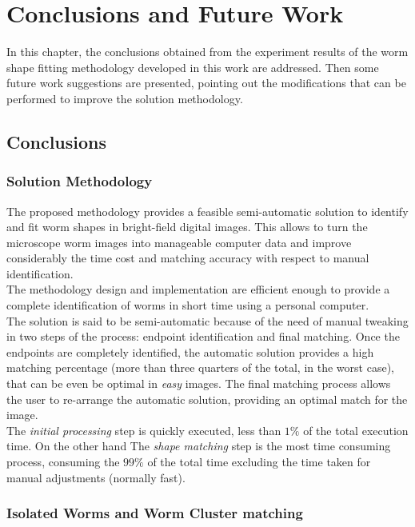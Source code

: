 \thispagestyle{empty}
\cleardoublepage
\chapter{Conclusions and Future Work}

In this chapter, the conclusions obtained from the experiment results of the 
worm shape fitting methodology developed in this work are addressed.
Then some future work suggestions are presented, pointing out the modifications
that can be performed to improve the solution methodology.

\section{Conclusions}

\subsection*{Solution Methodology}

The proposed methodology provides a feasible semi-automatic solution
to identify and fit worm shapes in bright-field digital images. This allows
to turn the microscope worm images into manageable computer data and 
improve considerably the time cost and matching accuracy with respect
to manual identification.\\
The methodology design and implementation are efficient enough to provide
a complete identification of worms in short time using a personal computer.\\
The solution is said to be semi-automatic because of the need of manual
tweaking in two steps of the process: endpoint identification and
final matching. Once the endpoints are completely identified, the automatic
solution provides a high matching percentage (more than three quarters of 
the total, in the worst case), that can be even be optimal in \emph{easy} 
images. The final matching process allows the user to re-arrange the 
automatic solution, providing an optimal match for the image.\\
The \emph{initial processing} step is quickly executed, less than
$1\%$ of the total execution time. On the other hand The \emph{shape matching}
step is the most time consuming process, consuming the $99\%$ of the total
time excluding the time taken for manual adjustments (normally fast).

\subsection*{Isolated Worms and Worm Cluster matching}


